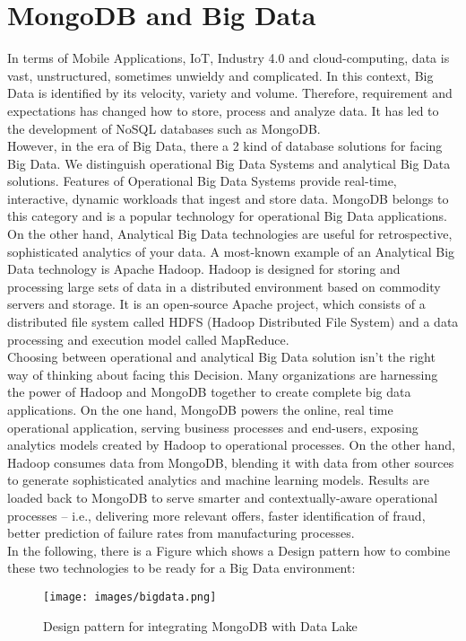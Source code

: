 \section{MongoDB and Big Data}
In terms of Mobile Applications, IoT, Industry 4.0 and cloud-computing, data is vast, unstructured, sometimes unwieldy and complicated. In this context, Big Data is identified by its velocity, variety and volume. Therefore, requirement and expectations has changed how to store, process and analyze data. It has led to the development of NoSQL databases such as MongoDB\cite{MongoDBInc.2013}.
\\
However, in the era of Big Data, there a 2 kind of database solutions for facing Big Data. We distinguish operational Big Data Systems and analytical Big Data solutions. Features of Operational Big Data Systems provide real-time, interactive, dynamic workloads that ingest and store data. MongoDB belongs to this category and is a popular technology for operational Big Data applications\cite{MongoDBInc.2013}.
\\
On the other hand, Analytical Big Data technologies are useful for retrospective, sophisticated analytics of your data. A most-known example of an Analytical Big Data technology is Apache Hadoop. Hadoop is designed for storing and processing large sets of data in a distributed environment based on commodity servers and storage. It is an open-source Apache project, which consists of a distributed file system called HDFS (Hadoop Distributed File System) and a data processing and execution model called MapReduce\cite{Wadkar2014}.
\\
Choosing between operational and analytical Big Data solution isn’t the right way of thinking about facing this Decision. Many organizations are harnessing the power of Hadoop and MongoDB together to create complete big data applications. On the one hand, MongoDB powers the online, real time operational application, serving business processes and end-users, exposing analytics models created by Hadoop to operational processes. On the other hand, Hadoop consumes data from MongoDB, blending it with data from other sources to generate sophisticated analytics and machine learning models. Results are loaded back to MongoDB to serve smarter and contextually-aware operational processes – i.e., delivering more relevant offers, faster identification of fraud, better prediction of failure rates from manufacturing processes\cite{MongoDBInc.2013}.
\\
In the following, there is a Figure which shows a Design pattern how to combine these two technologies to be ready for a Big Data environment:
\begin{figure}[H]
\texttt{[image: images/bigdata.png]}
\caption{Design pattern for integrating MongoDB with Data Lake~\protect\cite{MongoDB2016}}
\end{figure}